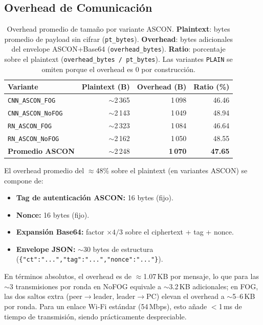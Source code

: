 \subsection{Overhead de Comunicación}

\begin{table}[H]
\centering
\caption{Overhead promedio de tamaño por variante ASCON. \textbf{Plaintext}: bytes promedio de payload sin cifrar (\texttt{pt\_bytes}). \textbf{Overhead}: bytes adicionales del envelope ASCON+Base64 (\texttt{overhead\_bytes}). \textbf{Ratio}: porcentaje sobre el plaintext (\texttt{overhead\_bytes / pt\_bytes}). Las variantes \texttt{PLAIN} se omiten porque el overhead es 0 por construcción.}
\label{tab:ascon_size}
\small
\begin{tabular}{l r r r}
\toprule
\textbf{Variante} & \textbf{Plaintext (B)} & \textbf{Overhead (B)} & \textbf{Ratio (\%)} \\
\midrule
\texttt{CNN\_ASCON\_FOG}    & $\sim$2\,365 & 1\,098 & 46.46 \\
\texttt{CNN\_ASCON\_NoFOG}  & $\sim$2\,143 & 1\,049 & 48.94 \\
\texttt{RN\_ASCON\_FOG}     & $\sim$2\,323 & 1\,084 & 46.64 \\
\texttt{RN\_ASCON\_NoFOG}   & $\sim$2\,162 & 1\,050 & 48.55 \\
\midrule
\textbf{Promedio ASCON}     & $\sim$2\,248 & \textbf{1\,070} & \textbf{47.65} \\
\bottomrule
\end{tabular}
\end{table}

El overhead promedio del $\approx$48\% sobre el plaintext (en variantes ASCON) se compone de:
\begin{itemize}
    \item \textbf{Tag de autenticación ASCON:} 16 bytes (fijo).
    \item \textbf{Nonce:} 16 bytes (fijo).
    \item \textbf{Expansión Base64:} factor $\times 4/3$ sobre el ciphertext + tag + nonce.
    \item \textbf{Envelope JSON:} $\sim$30 bytes de estructura (\texttt{\{"ct":"...","tag":"...","nonce":"..."\}}).
\end{itemize}

En términos absolutos, el overhead es de $\approx$1.07\,KB por mensaje, lo que para las $\sim$3 transmisiones por ronda en NoFOG equivale a $\sim$3.2\,KB adicionales; en FOG, las dos saltos extra (peer$\to$leader, leader$\to$PC) elevan el overhead a $\sim$5--6\,KB por ronda. Para un enlace Wi-Fi estándar (54\,Mbps), esto añade $<$1\,ms de tiempo de transmisión, siendo prácticamente despreciable.

